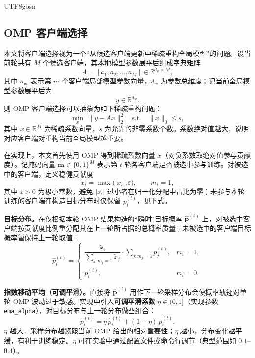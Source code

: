 \documentclass{article}
\begin{document}
\begin{CJK*}{UTF8}{gbsn}
\subsection{OMP 客户端选择}

本文将客户端选择视为一个“从候选客户端更新中稀疏重构全局模型”的问题。设当前轮共有 $M$ 个候选客户端，其本地模型参数展平后组成字典矩阵
\begin{equation}
A = [a_1,a_2,\dots,a_M]\in \mathbb{R}^{d_w\times M},
\end{equation}
其中 $a_m$ 表示第 $m$ 个客户端局部模型参数向量，$d_w$ 为参数总维度；记当前全局模型参数展平后为
\begin{equation}
y\in \mathbb{R}^{d_w}.
\end{equation}
则 OMP 客户端选择可以抽象为如下稀疏重构问题：
\begin{equation}
\min_{x}\ \|y-Ax\|_2^2\quad
\text{s.t.}\quad \|x\|_0 \leq s,
\end{equation}
其中 $x\in \mathbb{R}^{M}$ 为稀疏系数向量，$s$ 为允许的非零系数个数。系数绝对值越大，说明对应客户端对重构当前全局模型越重要。

在实现上，本文首先使用 OMP 得到稀疏系数向量 $x$（对负系数取绝对值参与贡献度）。记掩码向量 $\bm{m}\in\{0,1\}^M$ 表示第 $t$ 轮各客户端是否被选中参与训练。对被选中的客户端，定义稳健贡献度
\begin{equation}
\tilde{x}_i = \max\bigl(|x_i|,\varepsilon\bigr),\qquad m_i=1,
\end{equation}
其中 $\varepsilon>0$ 为极小常数，避免 $|x_i|$ 过小者在归一化分配中占比为零；未参与本轮训练的客户端在构造目标分布时仅保留 $p_i^{(t)}$，见下式。

\textbf{目标分布。}在仅根据本轮 OMP 结果构造的“瞬时”目标概率 $\hat{\bm{p}}^{(t)}$ 上，对被选中客户端按贡献度比例重分配其在上一轮所占据的总概率质量；未被选中的客户端目标概率暂保持上一轮取值：
\begin{equation}
\hat{p}_i^{(t)} =
\begin{cases}
\dfrac{\tilde{x}_i}{\sum_{j:m_j=1}\tilde{x}_j}\cdot \displaystyle\sum_{j:m_j=1}p_j^{(t)}, & m_i=1,\\[1.2ex]
p_i^{(t)}, & m_i=0.
\end{cases}
\end{equation}

\textbf{指数移动平均（可调平滑）。}直接将 $\hat{\bm{p}}^{(t)}$ 用作下一轮采样分布会使概率轨迹对单轮 OMP 波动过于敏感。实现中引入\textbf{可调平滑系数} $\eta\in(0,1]$（实现参数 \texttt{ema\_alpha}），对目标分布与上一轮分布做凸组合：
\begin{equation}
\tilde{p}_i^{(t)}=\eta\,\hat{p}_i^{(t)}+(1-\eta)\,p_i^{(t)}.
\end{equation}
$\eta$ 越大，采样分布越紧跟当前 OMP 给出的相对重要性；$\eta$ 越小，分布变化越平缓，有利于训练稳定。$\eta$ 可在实验中通过配置文件或命令行调节（典型范围如 $0.1$--$0.4$）。


\end{CJK*}
\end{document}
